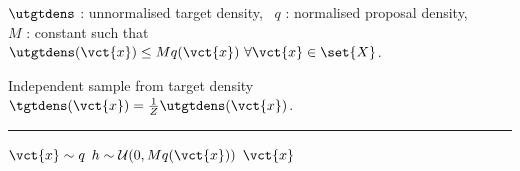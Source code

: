 \begin{algorithmic}
\small
    \Require
    $\utgtdens$ : unnormalised target density,~
    $q$ : normalised proposal density, \\
    $M$ : constant such that $\utgtdens(\vct{x}) \leq Mq(\vct{x}) ~\forall \vct{x} \in \set{X}$.
    \Ensure\raggedright
    Independent sample from target density $\tgtdens(\vct{x}) = \frac{1}{Z} \utgtdens(\vct{x})$.
\end{algorithmic}
\hrule
\small
\begin{algorithmic}[1]
  \Repeat
    \State $\vct{x} \sim q$ 
    \State $h \sim \mathcal{U}(0,Mq(\vct{x}))$
  \State \Return $\vct{x}$
\end{algorithmic}
